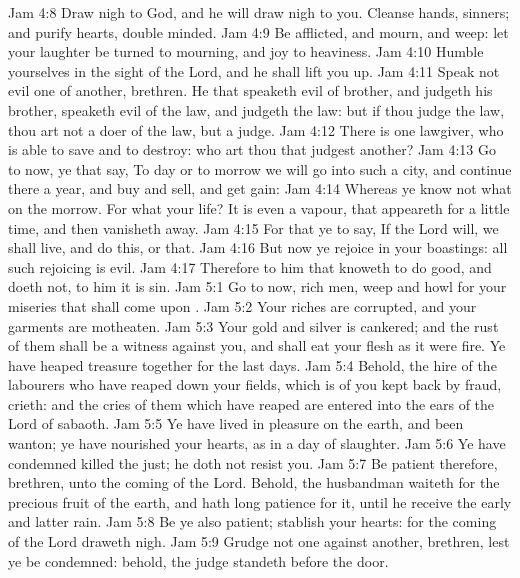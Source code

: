\vs Jam 4:8 Draw nigh to God, and he will draw nigh to you. Cleanse  hands,  sinners; and purify  hearts,  double minded.
\vs Jam 4:9 Be afflicted, and mourn, and weep: let your laughter be turned to mourning, and  joy to heaviness.
\vs Jam 4:10 Humble yourselves in the sight of the Lord, and he shall lift you up.
\vs Jam 4:11 Speak not evil one of another, brethren. He that speaketh evil of  brother, and judgeth his brother, speaketh evil of the law, and judgeth the law: but if thou judge the law, thou art not a doer of the law, but a judge.
\vs Jam 4:12 There is one lawgiver, who is able to save and to destroy: who art thou that judgest another?
\vs Jam 4:13 Go to now, ye that say, To day or to morrow we will go into such a city, and continue there a year, and buy and sell, and get gain:
\vs Jam 4:14 Whereas ye know not what  on the morrow. For what  your life? It is even a vapour, that appeareth for a little time, and then vanisheth away.
\vs Jam 4:15 For that ye  to say, If the Lord will, we shall live, and do this, or that.
\vs Jam 4:16 But now ye rejoice in your boastings: all such rejoicing is evil.
\vs Jam 4:17 Therefore to him that knoweth to do good, and doeth  not, to him it is sin.
\vs Jam 5:1 Go to now,  rich men, weep and howl for your miseries that shall come upon .
\vs Jam 5:2 Your riches are corrupted, and your garments are motheaten.
\vs Jam 5:3 Your gold and silver is cankered; and the rust of them shall be a witness against you, and shall eat your flesh as it were fire. Ye have heaped treasure together for the last days.
\vs Jam 5:4 Behold, the hire of the labourers who have reaped down your fields, which is of you kept back by fraud, crieth: and the cries of them which have reaped are entered into the ears of the Lord of sabaoth.
\vs Jam 5:5 Ye have lived in pleasure on the earth, and been wanton; ye have nourished your hearts, as in a day of slaughter.
\vs Jam 5:6 Ye have condemned  killed the just;  he doth not resist you.
\vs Jam 5:7 Be patient therefore, brethren, unto the coming of the Lord. Behold, the husbandman waiteth for the precious fruit of the earth, and hath long patience for it, until he receive the early and latter rain.
\vs Jam 5:8 Be ye also patient; stablish your hearts: for the coming of the Lord draweth nigh.
\vs Jam 5:9 Grudge not one against another, brethren, lest ye be condemned: behold, the judge standeth before the door.
